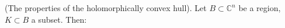 (The properties of the holomorphically convex hull). Let $B \subset \mathbb{C}^n$ be a region, $K \subset B$ a subset. Then:
